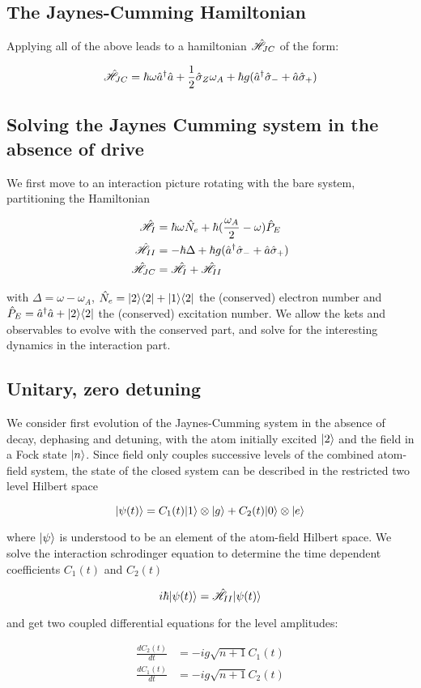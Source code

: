 \subsection{The Jaynes-Cumming Hamiltonian}
Applying all of the above leads to a hamiltonian $\hat{\mathscr{H}}_{JC}$ of the form:

\begin{equation}
	\hat{\mathscr{H}}_{JC} = \hbar \omega \hat{a}^\dagger \hat{a} +\frac{1}{2} \hat{\sigma}_Z \omega_A + \hbar g (\hat{a}^\dagger \hat{\sigma}_- + \hat{a} \hat{\sigma}_+)
\end{equation}

\subsection{Solving the Jaynes Cumming system in the absence of drive}
We first move to an interaction picture rotating with the bare system, partitioning the Hamiltonian

\begin{align}
	\hat{\mathscr{H}}_I &= \hbar \omega \hat{N}_e + \hbar(\frac{\omega_A}{2}-\omega)\hat{P}_E \\
	\hat{\mathscr{H}}_{II} &= -\hbar \Delta + \hbar g (\hat{a}^\dagger \hat{\sigma}_- + \hat{a} \hat{\sigma}_+) \\
	\hat{\mathscr{H}}_{JC} &= \hat{\mathscr{H}}_I+\hat{\mathscr{H}}_{II}
\end{align}

with $\Delta = \omega-\omega_A$,   $\hat{N}_e = | 2 \rangle \langle2 | + | 1 \rangle \langle2 | $ the (conserved) electron number and $\hat{P}_E = \hat{a}^\dagger\hat{a} + | 2 \rangle\langle2 | $ the (conserved) excitation number.
We allow the kets and observables to evolve with the conserved part, and solve for the interesting dynamics in the interaction part.

\subsection{Unitary, zero detuning}
We consider first evolution of the Jaynes-Cumming system in the absence of decay, dephasing and detuning, with the atom initially excited $| 2 \rangle$ and the field in a Fock state $| n \rangle$.
Since field only couples successive levels of the combined atom-field system, the state of the closed system can be described in the restricted two level Hilbert space

\begin{equation}
	| \psi(t) \rangle = C_1(t) | 1 \rangle \otimes| g \rangle + C_2(t) | 0 \rangle \otimes| e \rangle
\end{equation}

where $| \psi \rangle$ is understood to be an element of the atom-field Hilbert space.
We solve the interaction schrodinger equation to determine the time dependent coefficients $C_1(t)$ and $C_2(t)$

\begin{equation}
	i \hbar| \psi(t) \rangle = \hat{\mathscr{H}}_{II} | \psi(t) \rangle
\end{equation}

and get two coupled differential equations for the level amplitudes:

\begin{align}
	\frac{d C_2(t)}{dt} &= -i g \sqrt{n+1}C_1(t)\\
	\frac{d C_1(t)}{dt} &= -i g \sqrt{n+1}C_2(t)
\end{align}

